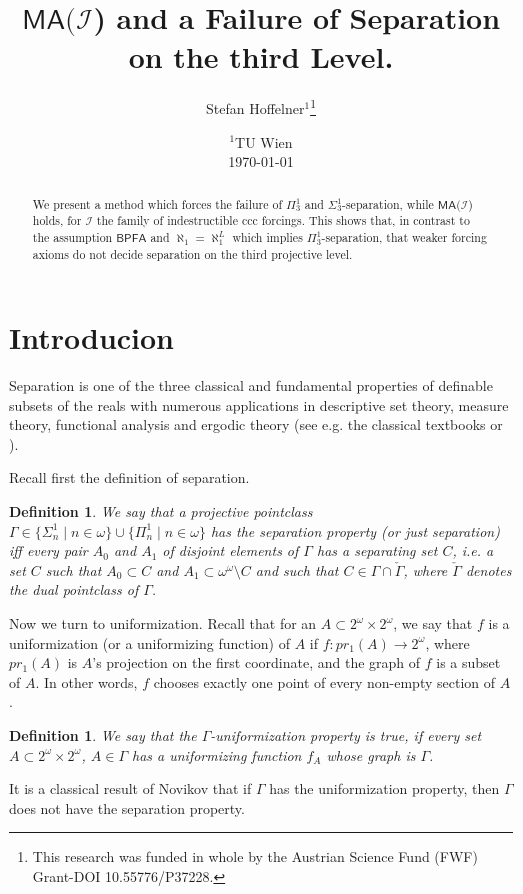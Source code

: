 \documentclass[a4paper,11pt]{article}
\title{$\mathsf{MA} (\mathcal{I}$) and a Failure of Separation on the third Level.}
\author{ Stefan Hoffelner$^{1}$\footnote{This research was funded in whole by the Austrian Science Fund (FWF) Grant-DOI 10.55776/P37228. }  }
\date{
    $^1$TU Wien \\
    \today
}
\newtheorem{definition}[theorem]{Definition}
\newcommand{\BPFA}{\mathsf{BPFA}}
\begin{document}
\maketitle
\begin{abstract}
We present a method which forces the failure of $\Pi^1_3$ and $\Sigma^1_3$-separation, while $\mathsf{MA} (\mathcal{I}$) holds, for $\mathcal{I}$ the family of indestructible ccc forcings. This shows that, in contrast to the assumption $\BPFA$ and $\aleph_1=\aleph_1^L$ which implies $\Pi^1_3$-separation, that weaker forcing axioms do not decide separation on the third projective level.
\end{abstract}



\section{Introducion}
Separation is one of the three classical and fundamental properties of definable subsets of the reals with numerous applications in descriptive set theory, measure theory, functional analysis and ergodic theory (see  e.g. the classical textbooks \cite{Moschovakis} or \cite{Kechris}).

Recall first the definition of separation.
\begin{definition}
 We say that a projective pointclass $\Gamma \in \{ \Sigma^1_n \mid n \in \omega\} \cup \{\Pi^1_n \mid n \in \omega \}$ has the separation 
 property (or just separation) iff every pair $A_0$ and $A_1$ of disjoint elements of  $\Gamma$ has a separating set $C$, i.e. a set $C$ such that $A_0 \subset C$ and $A_1 \subset \omega^{\omega} \setminus C$ and such that $C
   \in \Gamma \cap \check{\Gamma}$, where  $\check{\Gamma}$ denotes the dual pointclass of $\Gamma$.
\end{definition}
Now we turn to uniformization. Recall that for an $A \subset 2^{\omega} \times 2^{\omega}$, we say that $f$ is a uniformization (or a uniformizing function) of
$A$ if $f: pr_1 (A) \rightarrow 2^{\omega}$, where $pr_1(A)$ is $A$'s projection on the first coordinate, and the graph of $f$ is a subset of $A$. In other words, $f$ chooses exactly one point of every non-empty section of $A$.

\begin{definition}
 We say that the $\Gamma$-uniformization property is true, if 
every set $A \subset 2^{\omega} \times 2^{\omega}$, $A \in \Gamma$ has a uniformizing function $f_A$ whose graph is $\Gamma$.
\end{definition}
It is a classical result of Novikov that if $\Gamma$ has the uniformization property, then $\Gamma$ does not have the separation property.
\end{document}

